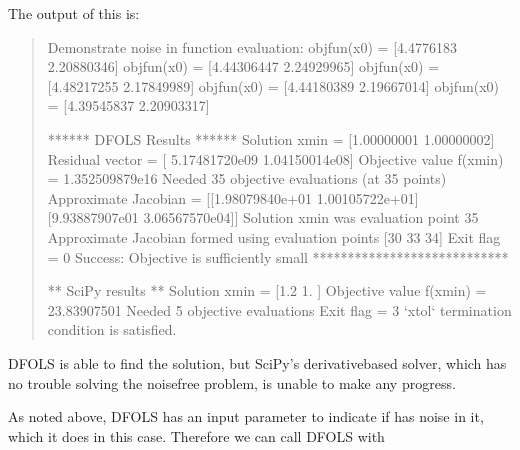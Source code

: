 \documentclass[letterpaper,10pt,english]{sphinxmanual}
\begin{document}
\sphinxAtStartPar
The output of this is:
\begin{quote}

\begin{sphinxVerbatim}[commandchars=\\\{\}]
Demonstrate noise in function evaluation:
objfun(x0) = [\PYGZhy{}4.4776183   2.20880346]
objfun(x0) = [\PYGZhy{}4.44306447  2.24929965]
objfun(x0) = [\PYGZhy{}4.48217255  2.17849989]
objfun(x0) = [\PYGZhy{}4.44180389  2.19667014]
objfun(x0) = [\PYGZhy{}4.39545837  2.20903317]

****** DFO\PYGZhy{}LS Results ******
Solution xmin = [1.00000001 1.00000002]
Residual vector = [ 5.17481720e\PYGZhy{}09 \PYGZhy{}1.04150014e\PYGZhy{}08]
Objective value f(xmin) = 1.352509879e\PYGZhy{}16
Needed 35 objective evaluations (at 35 points)
Approximate Jacobian = [[\PYGZhy{}1.98079840e+01  1.00105722e+01]
 [\PYGZhy{}9.93887907e\PYGZhy{}01 \PYGZhy{}3.06567570e\PYGZhy{}04]]
Solution xmin was evaluation point 35
Approximate Jacobian formed using evaluation points [30 33 34]
Exit flag = 0
Success: Objective is sufficiently small
****************************


** SciPy results **
Solution xmin = [\PYGZhy{}1.2  1. ]
Objective value f(xmin) = 23.83907501
Needed 5 objective evaluations
Exit flag = 3
`xtol` termination condition is satisfied.
\end{sphinxVerbatim}
\end{quote}

\sphinxAtStartPar
DFO\sphinxhyphen{}LS is able to find the solution, but SciPy’s derivative\sphinxhyphen{}based solver, which has no trouble solving the noise\sphinxhyphen{}free problem, is unable to make any progress.

\sphinxAtStartPar
As noted above, DFO\sphinxhyphen{}LS has an input parameter  to indicate if  has noise in it, which it does in this case. Therefore we can call DFO\sphinxhyphen{}LS with
\begin{quote}

\begin{sphinxVerbatim}[commandchars=\\\{\}]
    
\end{sphinxVerbatim}
\end{quote}
\end{document}
